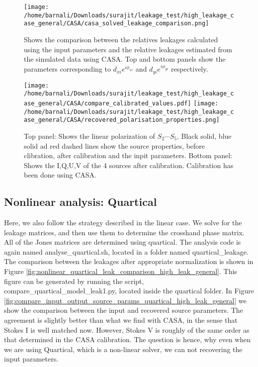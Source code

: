\documentclass{article}
\begin{document}
\begin{figure}
\centering
\texttt{[image: /home/barnali/Downloads/surajit/leakage\_test/high\_leakage\_case\_general/CASA/casa\_solved\_leakage\_comparison.png]}
\caption{Shows the comparison between the relatives leakages calculated using the input parameters and the relative leakages estimated from the simulated data using CASA. Top and bottom panels show the parameters corresponding to $d_{xi}e^{i\phi_{xi}}$ and $d_{yi}e^{i\phi_{yi}}$ respectively. }
\label{fig:linear_CASA_leak_comparison_high_leak_general}
\end{figure} 

\begin{figure}
\centering
\texttt{[image: /home/barnali/Downloads/surajit/leakage\_test/high\_leakage\_case\_general/CASA/compare\_calibrated\_values.pdf]}
\texttt{[image: /home/barnali/Downloads/surajit/leakage\_test/high\_leakage\_case\_general/CASA/recovered\_polarisation\_properties.png]}
\caption{Top panel: Shows the linear polarization of $S_2\cdots S_5$. Black solid, blue solid ad red dashed lines show the source properties, before clibration, after calibration and the inpit parameters. Bottom panel: Shows the I,Q,U,V of the 4 sources after calibration. Calibration has been done using CASA.}
\label{fig:compare_input_output_source_params_high_leak_general}
\end{figure}



\subsection{Nonlinear analysis: Quartical}

Here, we also follow the strategy described in the linear case. We solve for the leakage matrices, and then use them to determine the crosshand phase matrix. All of the Jones matrices are determined using quartical. The analysis code is again named  analyse\_quartical.sh, located in a folder named quartical\_leakage. The comparison between the leakages after appropriate normalization is shown in Figure \ref{fig:nonlinear_quartical_leak_comparison_high_leak_general}. This figure can be generated by running the script, compare\_quartical\_model\_leak1.py, located inside the quartical folder. In Figure \ref{fig:compare_input_output_source_params_quartical_high_leak_general} we show the comparison between the input and recovered source parameters. The agreement is slightly better than what we find with CASA, in the sense that Stokes I is well matched now. However, Stokes V is roughly of the same order as that determined in the CASA calibration. The question is hence, why even when we are using Quartical, which is a non-linear solver, we can not recovering the input parameters. 
\end{document}
